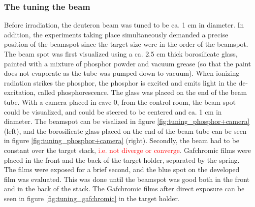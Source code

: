 \subsubsection{The tuning the beam}
Before irradiation, the deuteron beam was tuned to be ca. 1 cm in diameter. In addition, the experiments taking place simultaneously demanded a precise position of the beamspot since the target size were in the order of the beamspot. The beam spot was first visualized using a ca. 2.5 cm thick borosilicate glass, painted with a mixture of phosphor powder and vacuum grease (so that the paint does not evaporate as the tube was pumped down to vacuum). When ionizing radiation strikes the phosphor, the phosphor is excited and emits light in the de-excitation, called phosphorescence.  The glass was placed on the end of the beam tube. With a camera placed in cave 0, from the control room, the beam spot could be visualized, and could be steered to be centered and ca. 1 cm in diameter. The beamspot can be visalized in figure \ref{fig:tuning_phosphor+camera} (left), and the borosilicate glass placed on the end of the beam tube can be seen in figure \ref{fig:tuning_phosphor+camera} (right). Secondly, the beam had to be constant over the target stack, \textcolor{red}{i.e. not diverge or converge}. Gafchromic films were placed in the front and the back of the target holder, separated by the spring. The films were exposed for a brief second, and the blue spot on the developed film was evaluated. This was done until the beamspot was good both in the front and in the back of the stack. The Gafchromic films after direct exposure can be seen in figure \ref{fig:tuning_gafchromic} in the target holder.  \\

